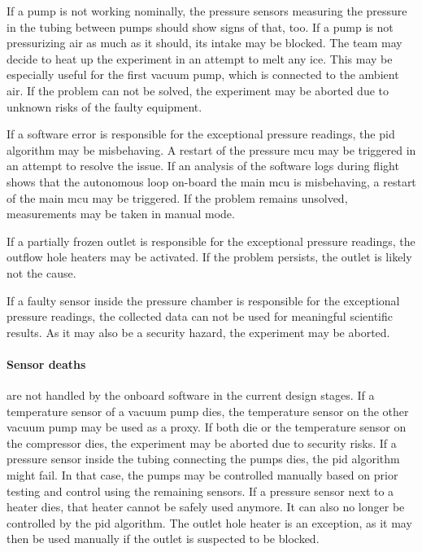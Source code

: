 If a pump is not working nominally, the pressure sensors measuring the pressure in the tubing between pumps should show signs of that, too. 
If a pump is not pressurizing air as much as it should, its intake may be blocked. 
The team may decide to heat up the experiment in an attempt to melt any ice.
This may be especially useful for the first vacuum pump, which is connected to the ambient air.
If the problem can not be solved, the experiment may be aborted due to unknown risks of the faulty equipment.\par 

If a software error is responsible for the exceptional pressure readings, the \gls{pid} algorithm may be misbehaving.
A restart of the pressure \gls{mcu} may be triggered in an attempt to resolve the issue. 
If an analysis of the software logs during flight shows that the autonomous loop on-board the main \gls{mcu} is misbehaving, a restart of the main \gls{mcu} may be triggered.
If the problem remains unsolved, measurements may be taken in manual mode.\par 

If a partially frozen outlet is responsible for the exceptional pressure readings, the outflow hole heaters may be activated.
If the problem persists, the outlet is likely not the cause.\par 

If a faulty sensor inside the pressure chamber is responsible for the exceptional pressure readings, the collected data can not be used for meaningful scientific results.
As it may also be a security hazard, the experiment may be aborted.\par 

\paragraph{Sensor deaths} are not handled by the onboard software in the current design stages.
If a temperature sensor of a vacuum pump dies, the temperature sensor on the other vacuum pump may be used as a proxy. 
If both die or the temperature sensor on the compressor dies, the experiment may be aborted due to security risks.\newline 
If a pressure sensor inside the tubing connecting the pumps dies, the \gls{pid} algorithm might fail. 
In that case, the pumps may be controlled manually based on prior testing and control using the remaining sensors.\newline
If a pressure sensor next to a heater dies, that heater cannot be safely used anymore. It can also no longer be controlled by the \gls{pid} algorithm. 
The outlet hole heater is an exception, as it may then be used manually if the outlet is suspected to be blocked.

